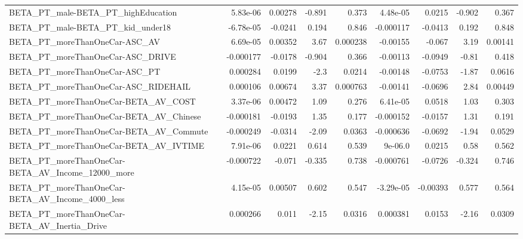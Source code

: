 \begin{tabular}{lrrrrrrrr}
BETA\_PT\_male-BETA\_PT\_highEducation                 &    5.83e-06 &      0.00278 &   -0.891 &    0.373 &   4.48e-05 &      0.0215 &       -0.902 &         0.367 \\
BETA\_PT\_male-BETA\_PT\_kid\_under18                   &   -6.78e-05 &      -0.0241 &    0.194 &    0.846 &  -0.000117 &     -0.0413 &        0.192 &         0.848 \\
BETA\_PT\_moreThanOneCar-ASC\_AV                      &    6.69e-05 &      0.00352 &     3.67 & 0.000238 &   -0.00155 &      -0.067 &         3.19 &       0.00141 \\
BETA\_PT\_moreThanOneCar-ASC\_DRIVE                   &   -0.000177 &      -0.0178 &   -0.904 &    0.366 &   -0.00113 &     -0.0949 &        -0.81 &         0.418 \\
BETA\_PT\_moreThanOneCar-ASC\_PT                      &    0.000284 &       0.0199 &     -2.3 &   0.0214 &   -0.00148 &     -0.0753 &        -1.87 &        0.0616 \\
BETA\_PT\_moreThanOneCar-ASC\_RIDEHAIL                &    0.000106 &      0.00674 &     3.37 & 0.000763 &   -0.00141 &     -0.0696 &         2.84 &       0.00449 \\
BETA\_PT\_moreThanOneCar-BETA\_AV\_COST                &    3.37e-06 &      0.00472 &     1.09 &    0.276 &   6.41e-05 &      0.0518 &         1.03 &         0.303 \\
BETA\_PT\_moreThanOneCar-BETA\_AV\_Chinese             &   -0.000181 &      -0.0193 &     1.35 &    0.177 &  -0.000152 &     -0.0157 &         1.31 &         0.191 \\
BETA\_PT\_moreThanOneCar-BETA\_AV\_Commute             &   -0.000249 &      -0.0314 &    -2.09 &   0.0363 &  -0.000636 &     -0.0692 &        -1.94 &        0.0529 \\
BETA\_PT\_moreThanOneCar-BETA\_AV\_IVTIME              &    7.91e-06 &       0.0221 &    0.614 &    0.539 &    9e-06.0 &      0.0215 &         0.58 &         0.562 \\
BETA\_PT\_moreThanOneCar-BETA\_AV\_Income\_12000\_more   &   -0.000722 &       -0.071 &   -0.335 &    0.738 &  -0.000761 &     -0.0726 &       -0.324 &         0.746 \\
BETA\_PT\_moreThanOneCar-BETA\_AV\_Income\_4000\_less    &    4.15e-05 &      0.00507 &    0.602 &    0.547 &  -3.29e-05 &    -0.00393 &        0.577 &         0.564 \\
BETA\_PT\_moreThanOneCar-BETA\_AV\_Inertia\_Drive       &    0.000266 &        0.011 &    -2.15 &   0.0316 &   0.000381 &      0.0153 &        -2.16 &        0.0309 \\

\end{tabular}

